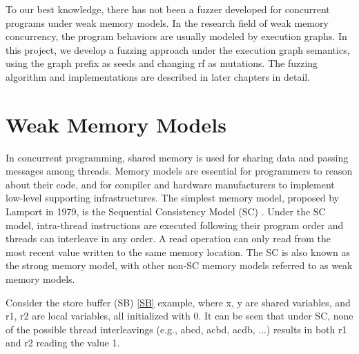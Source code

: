 To our best knowledge, there has not been a fuzzer developed for concurrent programs under weak memory models. In the research field of weak memory concurrency, the program behaviors are usually modeled by execution graphs. In this project, we develop a fuzzing approach under the execution graph semantics, using the graph prefix as seeds and changing rf as mutations. The fuzzing algorithm and implementations are described in later chapters in detail.

\section{Weak Memory Models}

In concurrent programming, shared memory is used for sharing data and passing messages among threads. Memory models are essential for programmers to reason about their code, and for compiler and hardware manufacturers to implement low-level supporting infrastructures. The simplest memory model, proposed by Lamport\cite{SC} in 1979, is the Sequential Consistency Model (SC) . Under the SC model, intra-thread instructions are executed following their program order and threads can interleave in any order. A read operation can only read from the most recent value written to the same memory location. The SC is also known as the strong memory model, with other non-SC memory models referred to as weak memory models.

Consider the store buffer (SB) \ref{SB} example, where x, y are shared variables, and r1, r2 are local variables, all initialized with 0. It can be seen that under SC, none of the possible thread interleavings (e.g., abcd, acbd, acdb, ...) results in both r1 and r2 reading the value 1.


